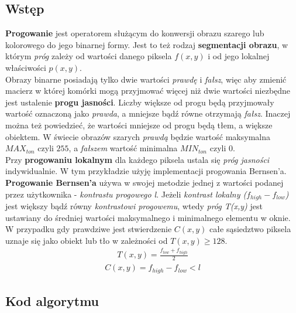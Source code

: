 \documentclass[a4paper,12pt]{book}
\begin{document}
\subsection*{Wstęp}
\textbf{Progowanie} jest operatorem służącym do konwersji obrazu szarego lub kolorowego do jego binarnej formy. Jest to też rodzaj \textbf{segmentacji obrazu}, w którym \textit{próg} zależy od wartości danego piksela $f(x,y)$ i od jego lokalnej właściwości $p(x,y)$.  \\
Obrazy binarne posiadają tylko dwie wartości \textit{prawdę} i \textit{fałsz}, więc aby zmienić macierz w której komórki mogą przyjmować więcej niż dwie wartości niezbędne jest ustalenie \textbf{progu jasności}. Liczby większe od progu będą przyjmowały wartość oznaczoną jako \textit{prawda}, a mniejsze bądź równe otrzymają \textit{fałsz}. Inaczej można też powiedzieć, że wartości mniejsze od progu będą tłem, a większe obiektem. W świecie obrazów szarych \textit{prawdą} będzie wartość maksymalna $MAX_{ton}$ czyli $255$, a \textit{fałszem} wartość minimalna $MIN_{ton}$ czyli $0$. \\
Przy \textbf{progowaniu lokalnym} dla każdego piksela ustala się \textit{próg jasności} indywidualnie. W tym przykładzie użyję implementacji progowania Bernsen'a. \\
\textbf{Progowanie Bernsen'a} używa w swojej metodzie jednej z wartości podanej przez użytkownika - \textit{kontrastu progowego l}. Jeżeli \textit{kontrast lokalny ($f_{high} - f_{low}$)} jest większy bądź równy \textit{kontrastowi progowemu}, wtedy \textit{próg T(x,y)} jest ustawiany do średniej wartości maksymalnego i minimalnego elementu w oknie. W przypadku gdy prawdziwe jest stwierdzenie $C(x,y)$ całe sąsiedztwo piksela uznaje się jako obiekt lub tło w zależności od $T(x,y) \geq 128$. 
\begin{gather}
	T(x,y) = \frac{f_{low} + f_{high}}{2}
\end{gather}
\begin{gather}
	C(x,y) = f_{high} - f_{low}<l
\end{gather}

\subsection*{Kod algorytmu}
\end{document}
